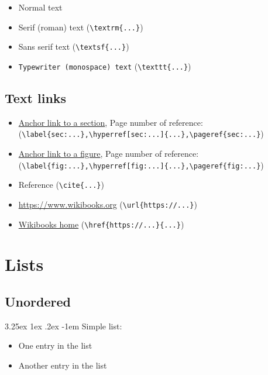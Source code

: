 \documentclass{article}				%
\makeatletter
\renewcommand\paragraph{\@startsection{paragraph}{5}{\z@}%
	{3.25ex \@plus1ex \@minus.2ex}%
	{-1em}%
	{\normalfont\normalsize\bfseries}}
\makeatother
\begin{document}
\begin{itemize}
	\item Normal text
	\item \textrm{Serif (roman) text} (\verb|\textrm{...}|)
	\item \textsf{Sans serif text} (\verb|\textsf{...}|)
	\item \texttt{Typewriter (monospace) text} (\verb|\texttt{...}|)
\end{itemize}

\subsection{Text links}

\begin{itemize}
	\item \hyperref[sec:exampleAnchor]{Anchor link to a section}, Page number of reference: \pageref{sec:exampleAnchor} \\(\verb|\label{sec:...},\hyperref[sec:...]{...},\pageref{sec:...}|)
	\item \hyperref[fig:pixelGraphic]{Anchor link to a figure}, Page number of reference: \pageref{fig:pixelGraphic} \\(\verb|\label{fig:...},\hyperref[fig:...]{...},\pageref{fig:...}|)
	\item Reference\cite{source01,source02} (\verb|\cite{...}|)
	\item \url{https://www.wikibooks.org} (\verb|\url{https://...}|)
	\item \href{https://www.wikibooks.org}{Wikibooks home} (\verb|\href{https://...}{...}|)
\end{itemize}

\section{Lists}

\subsection{Unordered}

\paragraph{Simple list:}

\begin{itemize}
	\item One entry in the list
	\item Another entry in the list
\end{itemize}
\end{document}
